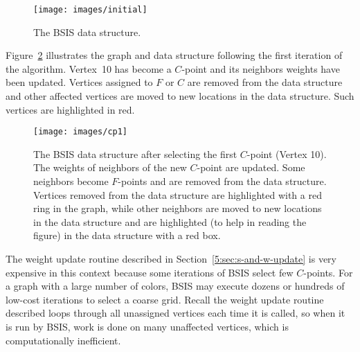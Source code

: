 \documentclass{elsart}
\begin{document}
\begin{figure}
  \begin{center}
    \texttt{[image: images/initial]}
    \caption{The BSIS data structure.}
    \label{5:fig:bucket-algorithm}
  \end{center}
\end{figure}

Figure~\ref{5:fig:bucket-algorithm-cp1} illustrates the graph and data
structure following the first iteration of the algorithm. Vertex~10
has become a $C$-point and its neighbors weights have been
updated. Vertices assigned to $F$ or $C$ are removed from the data
structure and other affected vertices are moved to new locations in
the data structure. Such vertices are highlighted in red.
\begin{figure}
  \begin{center}
    \texttt{[image: images/cp1]}
    \caption{The BSIS data structure after selecting the first
    $C$-point (Vertex 10). The weights of neighbors of the new
    $C$-point are updated. Some neighbors become $F$-points and are
    removed from the data structure. Vertices removed from the data
    structure are highlighted with a red ring in the graph, while
    other neighbors are moved to new locations in the data structure
    and are highlighted (to help in reading the figure) in the data
    structure with a red box.}
    \label{5:fig:bucket-algorithm-cp1}
  \end{center}
\end{figure}

The weight update routine described in
Section~\ref{5:sec:s-and-w-update} is very expensive in this context
because some iterations of BSIS select few $C$-points. For a graph
with a large number of colors, BSIS may execute dozens or hundreds of
low-cost iterations to select a coarse grid. Recall the weight update
routine described loops through all unassigned vertices each time it
is called, so when it is run by BSIS, work is done on many unaffected
vertices, which is computationally inefficient.
\end{document}
